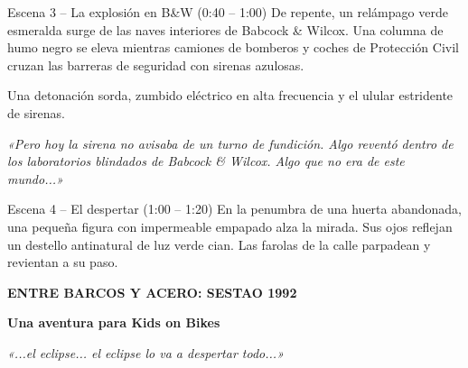 \begin{CajaCinematica}{Escena 3 -- La explosión en B\&W (0:40 -- 1:00)}
 De repente, un relámpago verde esmeralda surge de las naves interiores de Babcock \& Wilcox. Una columna de humo negro se eleva mientras camiones de bomberos y coches de Protección Civil cruzan las barreras de seguridad con sirenas azulosas.\par
{} Una detonación sorda, zumbido eléctrico en alta frecuencia y el ulular estridente de sirenas.\par
{}\par
\textit{«Pero hoy la sirena no avisaba de un turno de fundición. Algo reventó dentro de los laboratorios blindados de Babcock \& Wilcox. Algo que no era de este mundo...»}
\end{CajaCinematica}

\begin{CajaCinematica}{Escena 4 -- El despertar (1:00 -- 1:20)}
 En la penumbra de una huerta abandonada, una pequeña figura con impermeable empapado alza la mirada. Sus ojos reflejan un destello antinatural de luz verde cian. Las farolas de la calle parpadean y revientan a su paso.\par
{}\par
\textbf{ENTRE BARCOS Y ACERO: SESTAO 1992}\par
\textbf{Una aventura para Kids on Bikes}\par
{}\par
\textit{«...el eclipse... el eclipse lo va a despertar todo...»}
\end{CajaCinematica}
